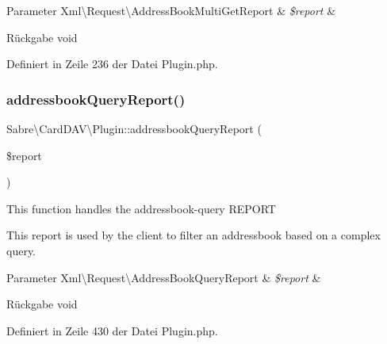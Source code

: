 \begin{DoxyParams}[1]{Parameter}
Xml\textbackslash{}\+Request\textbackslash{}\+Address\+Book\+Multi\+Get\+Report & {\em \$report} & \\
\hline
\end{DoxyParams}
\begin{DoxyReturn}{Rückgabe}
void 
\end{DoxyReturn}


Definiert in Zeile 236 der Datei Plugin.\+php.

\mbox{\label{class_sabre_1_1_card_d_a_v_1_1_plugin_a66ef72399eeef5a304dac24fd453b19a}} 
\subsubsection{\texorpdfstring{addressbook\+Query\+Report()}{addressbookQueryReport()}}
{\footnotesize\ttfamily Sabre\textbackslash{}\+Card\+D\+A\+V\textbackslash{}\+Plugin\+::addressbook\+Query\+Report (\begin{DoxyParamCaption}\item[{}]{\$report }\end{DoxyParamCaption})\hspace{0.3cm}{\ttfamily [protected]}}

This function handles the addressbook-\/query R\+E\+P\+O\+RT

This report is used by the client to filter an addressbook based on a complex query.


\begin{DoxyParams}[1]{Parameter}
Xml\textbackslash{}\+Request\textbackslash{}\+Address\+Book\+Query\+Report & {\em \$report} & \\
\hline
\end{DoxyParams}
\begin{DoxyReturn}{Rückgabe}
void 
\end{DoxyReturn}


Definiert in Zeile 430 der Datei Plugin.\+php.

\mbox{\label{class_sabre_1_1_card_d_a_v_1_1_plugin_a97c2b4b09f5d14e1cd3b0228b99a1267}} 

